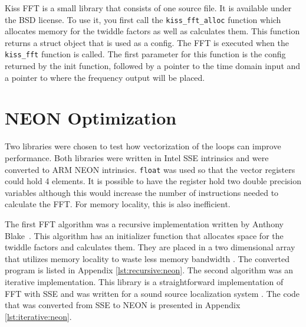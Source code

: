 Kiss FFT is a small library that consists of one source file. It is available under the BSD license. To use it, you first call the \texttt{kiss\_fft\_alloc} function which allocates memory for the twiddle factors as well as calculates them. This function returns a struct object that is used as a config. The FFT is executed when the \texttt{kiss\_fft} function is called. The first parameter for this function is the config returned by the init function, followed by a pointer to the time domain input and a pointer to where the frequency output will be placed.



\section{NEON Optimization}

Two libraries were chosen to test how vectorization of the loops can improve performance. Both libraries were written in Intel SSE intrinsics and were converted to ARM NEON intrinsics. \texttt{float} was used so that the vector registers could hold 4 elements. It is possible to have the register hold two double precision variables although this would increase the number of instructions needed to calculate the FFT. For memory locality, this is also inefficient.

The first FFT algorithm was a recursive implementation written by Anthony Blake~\cite{neon:recursive}. This algorithm has an initializer function that allocates space for the twiddle factors and calculates them. They are placed in a two dimensional array that utilizes memory locality to waste less memory bandwidth \cite{neon:recursive:details}. The converted program is listed in Appendix \ref{lst:recursive:neon}. The second algorithm was an iterative implementation. This library is a straightforward implementation of FFT with SSE \cite{code:manyears} and was written for a sound source localization system \cite{manyears:site}. The code that was converted from SSE to NEON is presented in Appendix \ref{lst:iterative:neon}.
